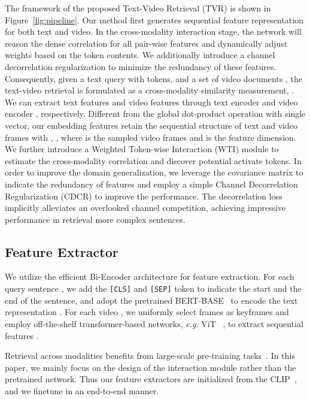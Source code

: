 \documentclass[runningheads]{llncs}
\begin{document}
The framework of the proposed Text-Video Retrieval (TVR) is shown in Figure~\ref{fig:pipeline}. 
Our method first generates sequential feature representation for both text and video. 
In the cross-modality interaction stage, the network will reason the dense correlation for all pair-wise features and dynamically adjust weights based on the token contents.
We additionally introduce a channel decorrelation regularization to minimize the redundancy of these features.
Consequently, given a text query  with  tokens, and a set of video documents , the text-video retrieval is formulated as a cross-modality similarity measurement, . 
We can extract text features  and video features  through text encoder  and video encoder , respectively.
Different from the global dot-product operation with single vector, our embedding features retain the sequential structure of text and video frames with , , where  is the sampled video frames and  is the feature dimension. 
We further introduce a Weighted Token-wise Interaction (WTI) module to estimate the cross-modality correlation and discover potential activate tokens.
In order to improve the domain generalization, we leverage the covariance matrix to indicate the redundancy of features and employ a simple Channel Decorrelation Regularization (CDCR) to improve the performance.
The decorrelation loss implicitly alleviates an overlooked channel competition, achieving impressive performance in retrieval more complex sentences.


\subsection{Feature Extractor}
We utilize the efficient Bi-Encoder architecture for feature extraction.
For each query sentence , we add the \texttt{[CLS]}  and \texttt{[SEP]} token to indicate the start and the end of the sentence, and adopt the pretrained BERT-BASE~\cite{bert} to encode the text representation .
For each video , we uniformly select  frames as keyframes and employ off-the-shelf transformer-based networks, \textit{e.g.} ViT~\cite{vit} , to extract sequential features .

Retrieval across modalities benefits from large-scale pre-training tasks~\cite{colbert,bert,clip}.
In this paper, we mainly focus on the design of the interaction module rather than the pretrained network. 
Thus our feature extractors are initialized from the CLIP~\cite{clip}, and we finetune in an end-to-end manner.
\end{document}
